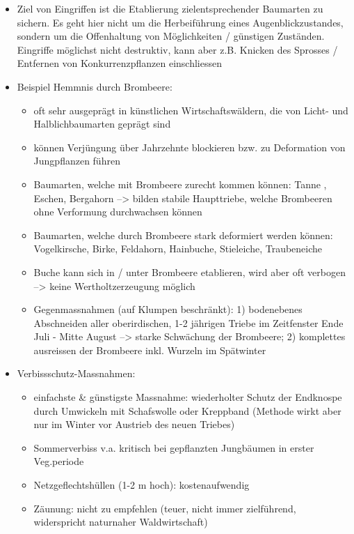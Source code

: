 \documentclass{article}
\begin{document}
\begin{itemize}
   \item Ziel von Eingriffen ist die Etablierung zielentsprechender Baumarten zu sichern. Es geht hier nicht um die Herbeiführung eines Augenblickzustandes, sondern um die Offenhaltung von Möglichkeiten / günstigen Zuständen. Eingriffe möglichst nicht destruktiv, kann aber z.B. Knicken des Sprosses / Entfernen von Konkurrenzpflanzen einschliessen

   \item Beispiel Hemmnis durch Brombeere:
   
    \begin{itemize}
    	\item oft sehr ausgeprägt in künstlichen Wirtschaftswäldern, die von Licht- und Halblichbaumarten geprägt sind
    	\item können Verjüngung über Jahrzehnte blockieren bzw. zu Deformation von Jungpflanzen führen
    	\item Baumarten, welche mit Brombeere zurecht kommen können: Tanne , Eschen, Bergahorn --> bilden stabile Haupttriebe, welche Brombeeren ohne Verformung durchwachsen können
    	\item Baumarten, welche durch Brombeere stark deformiert werden können: Vogelkirsche, Birke, Feldahorn, Hainbuche, Stieleiche, Traubeneiche
    	\item Buche kann sich in / unter Brombeere etablieren, wird aber oft verbogen --> keine Wertholtzerzeugung möglich
    	\item Gegenmassnahmen (auf Klumpen beschränkt): 1) bodenebenes Abschneiden aller oberirdischen, 1-2 jährigen Triebe im Zeitfenster Ende Juli - Mitte August --> starke Schwächung der Brombeere; 2) komplettes ausreissen der Brombeere inkl. Wurzeln im Spätwinter 	
    \end{itemize}
   
    \item Verbissschutz-Massnahmen:
    
      \begin{itemize}
        \item einfachste \& günstigste Massnahme: wiederholter Schutz der Endknospe durch Umwickeln mit Schafswolle oder Kreppband (Methode wirkt aber nur im Winter vor Austrieb des neuen Triebes)
        \item Sommerverbiss v.a. kritisch bei gepflanzten Jungbäumen in erster Veg.periode
        \item Netzgeflechtshüllen (1-2 m hoch): kostenaufwendig
        \item Zäunung: nicht zu empfehlen (teuer, nicht immer zielführend, widerspricht naturnaher Waldwirtschaft)    
      \end{itemize}
    

\end{itemize}
\end{document}
